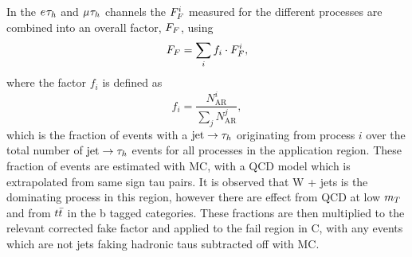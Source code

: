 In the $e_{}\tau_{h}$ and $\mu_{}\tau_{h}$ channels the $F_{F}^{i}$ measured for the different processes are combined into an overall factor, $F_{F}$, using
\begin{equation}
F_{F} = \sum_{i}f_{i}\cdot F_{F}^{i},
\end{equation}
where the factor $f_{i}$ is defined as
\begin{equation}
f_{i} = \frac{N_{\text{AR}}^{i}}{\sum\limits_{j}N_{\text{AR}}^{j}},
\end{equation}
which is the fraction of events with a $\text{jet}\rightarrow\tau_{h}$ originating from process $i$ over the total number of $\text{jet}\rightarrow\tau_{h}$ events for all processes in the application region.
These fraction of events are estimated with MC, with a QCD model which is extrapolated from same sign tau pairs.
It is observed that W + jets is the dominating process in this region, however there are effect from QCD at low $m_{T}$ and from $t\bar{t}$ in the b tagged categories. These fractions are then multiplied to the relevant corrected fake factor and applied to the fail region in C, with any events which are not jets faking hadronic taus subtracted off with MC. \\

